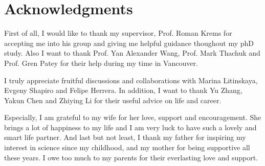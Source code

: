 
\chapter{Acknowledgments}


First of all, I would like to thank my supervisor, Prof. Roman Krems for accepting me into his group and giving me helpful guidance thoughout my phD study.
Also I want to thank Prof. Yan Alexander Wang, Prof. Mark Thachuk
and Prof. Gren Patey for their help during my time in Vancouver.
 
I truly appreciate fruitful discussions and collaborations with Marina Litinskaya, Evgeny Shapiro and Felipe Herrera. In addition, I want to thank Yu Zhang, Yakun Chen and Zhiying Li for their useful advice on life and career.
 
 
Especially, I am grateful to my wife for her love, support and encouragement. She brings a lot of happiness to my life and I am very
luck to have such a lovely and smart life partner.
And last but not least, I thank my father for inspiring my
interest in science since my childhood, and my mother for being supportive all these years. I owe too much to my parents
for their everlasting love and support.

